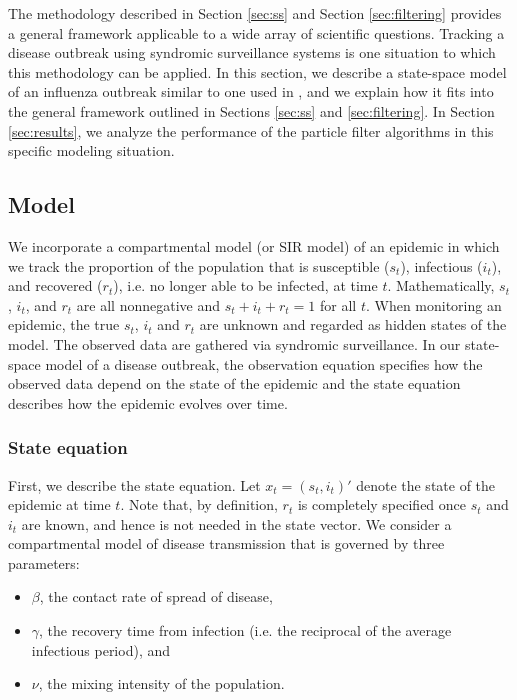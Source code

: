 \documentclass{elsarticle}
\begin{document}
The methodology described in Section \ref{sec:ss} and Section \ref{sec:filtering} provides a general framework applicable to a wide array of scientific questions. Tracking a disease outbreak using syndromic surveillance systems is one situation to which this methodology can be applied. In this section, we describe a state-space model of an influenza outbreak similar to one used in \citet{skvortsov2012monitoring}, and we explain how it fits into the general framework outlined in Sections \ref{sec:ss} and \ref{sec:filtering}. In Section \ref{sec:results}, we analyze the performance of the particle filter algorithms in this specific modeling situation.

\subsection{Model \label{sec:model}}

We incorporate a compartmental model (or SIR model) of an epidemic in which we track the proportion of the population that is susceptible ($s_t$), infectious ($i_t$), and recovered ($r_t$), i.e. no longer able to be infected, at time $t$. Mathematically, $s_t$, $i_t$, and $r_t$ are all nonnegative and $s_t + i_t + r_t = 1$ for all $t$. When monitoring an epidemic, the true $s_t$, $i_t$ and $r_t$ are unknown and regarded as hidden states of the model. The observed data are gathered via syndromic surveillance. In our state-space model of a disease outbreak, the observation equation specifies how the observed data depend on the state of the epidemic and the state equation describes how the epidemic evolves over time.

\subsubsection{State equation \label{sec:state}}

First, we describe the state equation. Let $x_t = (s_t,i_t)'$ denote the state of the epidemic at time $t$. Note that, by definition, $r_t$ is completely specified once $s_t$ and $i_t$ are known, and hence is not needed in the state vector. We consider a compartmental model of disease transmission that is governed by three parameters:

\begin{itemize}
\item $\beta$, the contact rate of spread of disease,
\item $\gamma$, the recovery time from infection (i.e. the reciprocal of the average infectious period), and
\item $\nu$, the mixing intensity of the population.
\end{itemize}
\end{document}
